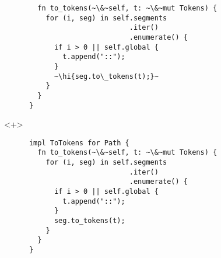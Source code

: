 \documentclass[usepdftitle=false]{beamer}
\renewcommand{\&}{\makebox[\widthof{\ampersand}][c]{\scalebox{0.9}[1.0]{\Book\ampersand}}}
\newcommand{\+}{\makebox[\widthof{+}][c]{\raisebox{-.2\height}{\scalefont{1.5}\Light+}}}
\newcommand{\hi}[1]{%
\tikz[baseline=(A.base)]
 \node[highlighting=0,inner sep=0pt,text depth=0pt] (A) {#1};%
}
\begin{document}
\begin{frame}[fragile]
\begin{onlyenv}
\begin{verbatim}
        fn to_tokens(~\&~self, t: ~\&~mut Tokens) {
          for (i, seg) in self.segments
                              .iter()
                              .enumerate() {
            if i > 0 || self.global {
              t.append("::");
            }
            ~\hi{seg.to\_tokens(t);}~
          }
        }
      }
    \end{verbatim}
  \end{onlyenv}
  \begin{onlyenv}<+>
    \begin{verbatim}
      impl ToTokens for Path {
        fn to_tokens(~\&~self, t: ~\&~mut Tokens) {
          for (i, seg) in self.segments
                              .iter()
                              .enumerate() {
            if i > 0 || self.global {
              t.append("::");
            }
            seg.to_tokens(t);
          }
        }
      }
    \end{verbatim}
  \end{onlyenv}
\end{frame}

\end{document}
